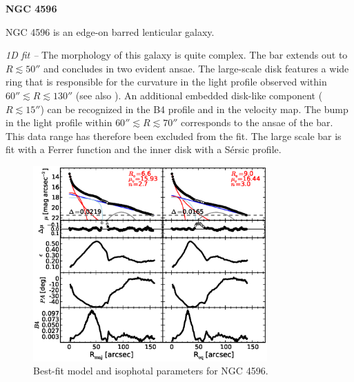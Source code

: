 \documentclass[preprint2]{emulateapj}
\newcommand{\fitfigurewidth}{0.8\textwidth}
\begin{document}
  \clearpage\newpage\noindent
  {\bf NGC 4596 \\}

  NGC 4596 is an edge-on barred lenticular galaxy.


  \emph{1D fit -- }
  The morphology of this galaxy is quite complex. 
  The bar extends out to $R \lesssim 50''$ and concludes in two evident ansae.
  The large-scale disk features a wide ring that is responsible for the curvature in the light profile observed within 
  $60'' \lesssim R \lesssim 130''$ (see also \citealt{comeron2014}).
  An additional embedded disk-like component ($R \lesssim 15''$) can be recognized in the B4 profile and in the velocity map.
  The bump in the light profile within $60'' \lesssim R \lesssim 70''$ corresponds to the ansae of the bar.
  This data range has therefore been excluded from the fit.
  The large scale bar is fit with a Ferrer function and the inner disk with a S\'ersic profile.

  \begin{figure}[h]
  \begin{center}
  \includegraphics[width=\fitfigurewidth]{images/n4596_1Dfit.eps}
  \caption{Best-fit model and isophotal parameters for NGC 4596.}
  \end{center}
  \end{figure}
\end{document}

